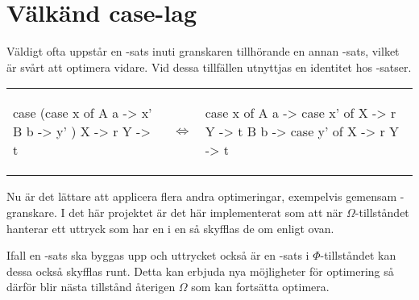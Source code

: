 \documentclass[../Optimise]{subfiles}
\begin{document}
\section{Välkänd case-lag}
\label{sec:CaseLaw}

Väldigt ofta uppstår en -sats inuti granskaren tillhörande en annan -sats, 
vilket är svårt att optimera vidare.
Vid dessa tillfällen utnyttjas en identitet hos -satser. \cite{santos}

\begin{tabular}{ m{5cm} m{0.5cm} m{5cm} }
\begin{codeEx}
 case (case x of
         A a -> x'
         B b -> y'
      )
   X -> r
   Y -> t
\end{codeEx}
	& $\Leftrightarrow$
	&
\begin{codeEx}
 case x of
     A a -> case x' of
              X -> r
              Y -> t
     B b -> case y' of
              X -> r
              Y -> t
\end{codeEx}
\\
\end{tabular}

Nu är det lättare att applicera flera andra optimeringar, 
exempelvis gemensam -granskare. 
I det här projektet är det här implementerat som att när $\Omega$-tillståndet hanterar ett 
uttryck som har en  i en  så skyfflas de om enligt ovan.

Ifall en -sats ska byggas upp och uttrycket också är en -sats i
$\Phi$-tillståndet kan dessa också skyfflas runt. Detta kan erbjuda nya möjligheter
för optimering så därför blir nästa tillstånd återigen $\Omega$ som kan fortsätta optimera.
\end{document}

